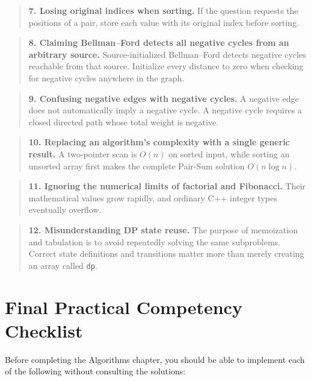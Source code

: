 \begin{quote}
\textbf{7. Losing original indices when sorting.}  If the question requests the positions of a pair, store each value with its original index before sorting.
\end{quote}

\begin{quote}
\textbf{8. Claiming Bellman--Ford detects all negative cycles from an arbitrary source.}  Source-initialized Bellman--Ford detects negative cycles reachable from that source. Initialize every distance to zero when checking for negative cycles anywhere in the graph.
\end{quote}

\begin{quote}
\textbf{9. Confusing negative edges with negative cycles.}  A negative edge does not automatically imply a negative cycle. A negative cycle requires a closed directed path whose total weight is negative.
\end{quote}

\begin{quote}
\textbf{10. Replacing an algorithm's complexity with a single generic result.}  A two-pointer scan is $O(n)$ on sorted input, while sorting an unsorted array first makes the complete Pair-Sum solution $O(n\log n)$.
\end{quote}

\begin{quote}
\textbf{11. Ignoring the numerical limits of factorial and Fibonacci.}  Their mathematical values grow rapidly, and ordinary C++ integer types eventually overflow.
\end{quote}

\begin{quote}
\textbf{12. Misunderstanding DP state reuse.}  The purpose of memoization and tabulation is to avoid repeatedly solving the same subproblems. Correct state definitions and transitions matter more than merely creating an array called \texttt{dp}.
\end{quote}


\section{Final Practical Competency Checklist}


Before completing the Algorithms chapter, you should be able to implement each of the following without consulting the solutions:

